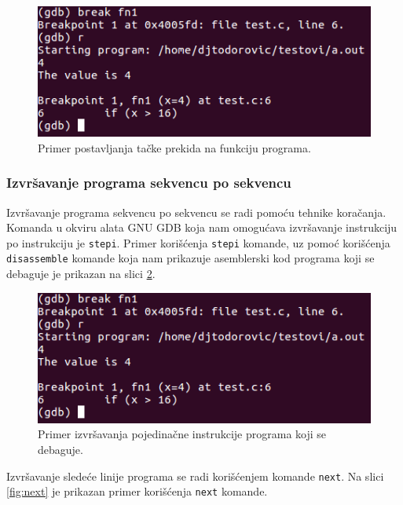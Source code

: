 \documentclass[12pt,oneside]{memoir}
\begin{document}
\begin{figure}[h!]
	\begin{center}
		\includegraphics[scale=0.5]{slike/break-fn.png}
	\end{center}
	\caption{Primer postavljanja tačke prekida na funkciju programa.}
	\label{fig:break-fn}
\end{figure}

\subsubsection{Izvršavanje programa sekvencu po sekvencu}

Izvršavanje programa sekvencu po sekvencu se radi pomoću tehnike koračanja. Komanda u okviru alata GNU GDB koja nam omogućava izvršavanje instrukciju po instrukciju je \texttt{stepi}. Primer korišćenja \texttt{stepi} komande, uz pomoć korišćenja \texttt{disassemble} komande koja nam prikazuje asemblerski kod programa koji se debaguje je prikazan na slici \ref{fig:stepi}.

\begin{figure}[h!]
	\begin{center}
		\includegraphics[scale=0.5]{slike/break-fn.png}
	\end{center}
	\caption{Primer izvršavanja pojedinačne instrukcije programa koji se debaguje.}
	\label{fig:stepi}
\end{figure}

Izvršavanje sledeće linije programa se radi korišćenjem komande \texttt{next}. Na slici \ref{fig:next} je prikazan primer korišćenja \texttt{next} komande.
\end{document}
